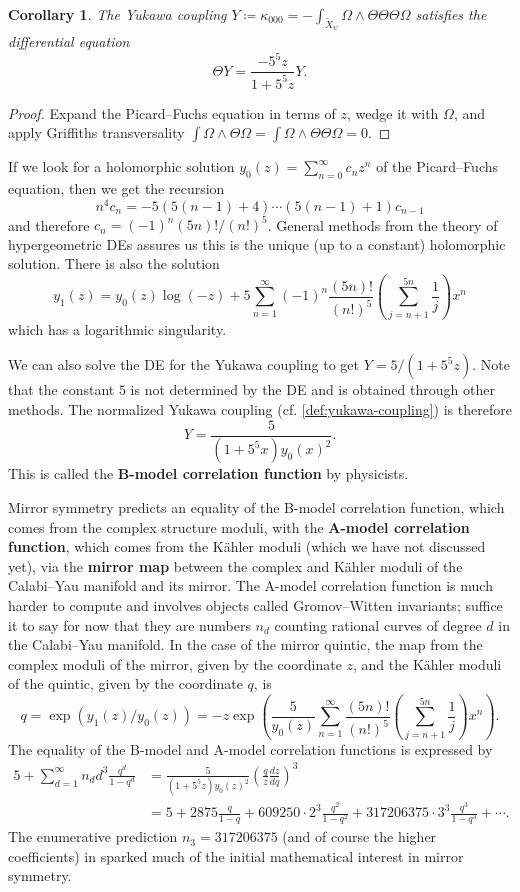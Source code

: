\documentclass{report}
\theoremstyle{plain}
\newtheorem{corollary}[theorem]{Corollary}
\theoremstyle{definition}
\theoremstyle{remark}
\begin{document}
\begin{corollary}
  The Yukawa coupling $Y \coloneqq \kappa_{000} =
  -\int_{\tilde{X}_\psi} \Omega \wedge \Theta \Theta \Theta \Omega$
  satisfies the differential equation
  \[ \Theta Y = \frac{-5^5 z}{1 + 5^5z} Y. \]
\end{corollary}

\begin{proof}
  Expand the Picard--Fuchs equation in terms of $z$, wedge it with
  $\Omega$, and apply Griffiths transversality $\int \Omega \wedge
  \Theta \Omega = \int \Omega \wedge \Theta\Theta\Omega = 0$.
\end{proof}

If we look for a holomorphic solution $y_0(z) = \sum_{n=0}^\infty c_n
z^n$ of the Picard--Fuchs equation, then we get the recursion
\[ n^4 c_n = -5(5(n-1)+4) \cdots (5(n-1)+1) c_{n-1} \]
and therefore $c_n = (-1)^n(5n)!/(n!)^5$. General methods from the
theory of hypergeometric DEs assures us this is the unique (up to a
constant) holomorphic solution. There is also the solution
\[ y_1(z) = y_0(z) \log(-z) + 5 \sum_{n=1}^\infty (-1)^n\frac{(5n)!}{(n!)^5} \left(\sum_{j=n+1}^{5n} \frac{1}{j}\right) x^n \]
which has a logarithmic singularity.

We can also solve the DE for the Yukawa coupling to get $Y = 5/(1 +
5^5z)$. Note that the constant $5$ is not determined by the DE and is
obtained through other methods. The normalized Yukawa coupling (cf.
\ref{def:yukawa-coupling}) is therefore
\[ Y = \frac{5}{(1 + 5^5x) y_0(x)^2}. \]
This is called the {\bf B-model correlation function} by physicists.

Mirror symmetry predicts an equality of the B-model correlation
function, which comes from the complex structure moduli, with the {\bf
  A-model correlation function}, which comes from the K\"ahler moduli
(which we have not discussed yet), via the {\bf mirror map} between
the complex and K\"ahler moduli of the Calabi--Yau manifold and its
mirror. The A-model correlation function is much harder to compute and
involves objects called Gromov--Witten invariants; suffice it to say
for now that they are numbers $n_d$ counting rational curves of degree
$d$ in the Calabi--Yau manifold. In the case of the mirror quintic,
the map from the complex moduli of the mirror, given by the coordinate
$z$, and the K\"ahler moduli of the quintic, given by the coordinate
$q$, is
\[ q = \exp(y_1(z)/y_0(z)) = -z \exp\left(\frac{5}{y_0(z)} \sum_{n=1}^\infty \frac{(5n)!}{(n!)^5} \left(\sum_{j=n+1}^{5n} \frac{1}{j}\right) x^n\right). \]
The equality of the B-model and A-model correlation functions is
expressed by
\begin{align*}
  5 + \sum_{d=1}^\infty n_d d^3 \frac{q^d}{1 - q^d}
  &= \frac{5}{(1 + 5^5z) y_0(z)^2} \left(\frac{q}{z} \frac{dz}{dq}\right)^3 \\
  &= 5 + 2875 \frac{q}{1-q} + 609250 \cdot 2^3 \frac{q^2}{1 - q^2} + 317206375 \cdot 3^3 \frac{q^3}{1 - q^3} + \cdots.
\end{align*}
The enumerative prediction $n_3 = 317206375$ (and of course the higher
coefficients) in \cite{Candelas1991a} sparked much of the initial
mathematical interest in mirror symmetry.
\end{document}
